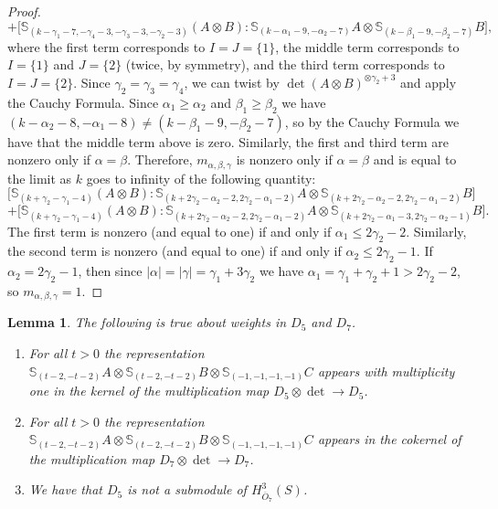 \documentclass[11pt,reqno]{amsart}
\newcommand{\oo}{\otimes}
\newcommand{\bS}{\mathbb{S}}
\renewcommand{\det}{\operatorname{det}}
\newcommand{\ol}[1]{\overline{#1}}
\newtheorem{lemma}[theorem]{Lemma}
\numberwithin{equation}{section}
\begin{document}
\begin{proof}
$$$$
$$
+\big[\bS_{(k-\gamma_1-7, -\gamma_4-3, -\gamma_3-3, -\gamma_2-3)}(A\oo B):\bS_{(k-\alpha_1-9,-\alpha_2-7)}A\oo \bS_{(k-\beta_1-9,-\beta_2-7)}B \big],
$$
where the first term corresponds to $I=J=\{1\}$, the middle term corresponds to $I=\{1\}$ and $J=\{2\}$ (twice, by symmetry), and the third term corresponds to $I=J=\{2\}$. Since $\gamma_2=\gamma_3=\gamma_4$, we can twist by $\det(A\oo B)^{\otimes \gamma_2+3}$ and apply the Cauchy Formula. Since $\alpha_1\geq \alpha_2$ and $\beta_1\geq \beta_2$ we have $(k-\alpha_2-8,-\alpha_1-8)\neq (k-\beta_1-9,-\beta_2-7)$, so by the Cauchy Formula we have that the middle term above is zero. Similarly, the first and third term are nonzero only if $\alpha=\beta$. Therefore, $m_{\alpha,\beta,\gamma}$ is nonzero only if $\alpha=\beta$ and is equal to the limit as $k$ goes to infinity of the following quantity:
$$
\big[\bS_{(k+\gamma_2-\gamma_1-4)}(A\oo B):\bS_{(k+2\gamma_2-\alpha_2-2,2\gamma_2-\alpha_1-2)}A\oo \bS_{(k+2\gamma_2-\alpha_2-2,2\gamma_2-\alpha_1-2)}B \big]
$$
$$
+\big[\bS_{(k+\gamma_2-\gamma_1-4)}(A\oo B):\bS_{(k+2\gamma_2-\alpha_2-2,2\gamma_2-\alpha_1-2)}A\oo \bS_{(k+2\gamma_2-\alpha_1-3,2\gamma_2-\alpha_2-1)}B \big].
$$
The first term is nonzero (and equal to one) if and only if $\alpha_1\leq 2\gamma_2-2$. Similarly, the second term is nonzero (and equal to one) if and only if $\alpha_2\leq 2\gamma_2-1$. If $\alpha_2=2\gamma_2-1$, then since $|\alpha|=|\gamma|=\gamma_1+3\gamma_2$ we have $\alpha_1=\gamma_1+\gamma_2+1>2\gamma_2-2$, so $m_{\alpha,\beta,\gamma}=1$. 
\end{proof}







\begin{lemma}\label{lem:factsD5lc7}
The following is true about weights in $D_5$ and $D_7$.
\begin{enumerate}
\item For all $t>0$ the representation $\bS_{(t-2,-t-2)}A \oo \bS_{(t-2,-t-2)}B\oo \bS_{(-1,-1,-1,-1)}C$ appears with multiplicity one in the kernel of the multiplication map $D_5\oo \det \to D_5$. 
\item For all $t>0$ the representation $\bS_{(t-2,-t-2)}A \oo \bS_{(t-2,-t-2)}B\oo \bS_{(-1,-1,-1,-1)}C$ appears in the cokernel of the multiplication map $D_7\oo \det \to D_7$.
\item We have that $D_5$ is not a submodule of  $H^3_{\ol{O}_7}(S)$.
\end{enumerate}

	
\end{lemma}
\end{document}
